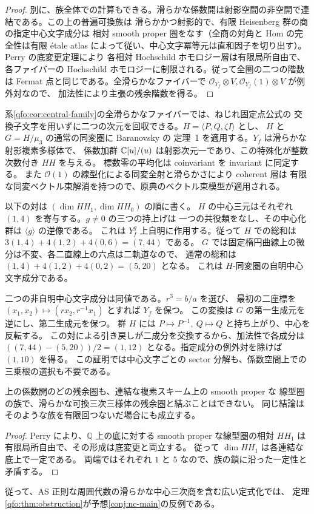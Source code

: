 \begin{proof}
別に、族全体での計算もできる。滑らかな係数開は射影空間の非空開で連結である。この上の普遍可換族は
滑らかかつ射影的で、有限 Heisenberg 群の商の指定中心文字成分は
相対 smooth proper 圏をなす（全商の対角と Hom の完全性は有限
\'etale atlas によって従い、中心文字冪等元は直和因子を切り出す）。
Perry \cite[Theorem~3.5]{QFOPerryHodge} の底変更定理により
各相対 Hochschild ホモロジー層は有限局所自由で、各ファイバーの
Hochschild ホモロジーに制限される。従って全圏の二つの階数は
Fermat 点と同じである。全滑らかなファイバーで
$\mathcal O_{Y_f}\otimes V,\mathcal O_{Y_f}(1)\otimes V$ が例外対なので、
加法性により主張の残余階数を得る。

\end{proof}

\begin{remark}[通常の固定点公式による独立計算]\label{qfo:rem:heisenberg-check}
系\ref{qfo:cor:central-family}の全滑らかなファイバーでは、ねじれ固定点公式の
交換子文字を用いずに二つの次元を回収できる。$H=\langle P,Q,\zeta I\rangle$ とし、
$H$ と $G=H/\mu_3$ の通常の同変圏に Baranovsky の
定理~1 \cite{QFOBaranovskyOrbifold}を適用する。$Y_f$ は滑らかな射影複素多様体で、
係数加群 $\mathbb C[u]/(u)$ は射影次元一であり、この特殊化が整数次数付き $HH$ を与える。
標数零の平均化は coinvariant を invariant に同定する。
また $\mathcal O(1)$ の線型化による同変全射と滑らかさにより coherent 層は
有限な同変ベクトル束解消を持つので、原典のベクトル束模型が適用される。

以下の対は $(\dim HH_1,\dim HH_0)$ の順に書く。
$H$ の中心三元はそれぞれ $(1,4)$ を寄与する。$g\ne0$ の三つの持上げは
一つの共役類をなし、その中心化群は $\langle g\rangle$ の逆像である。
これは $Y_f^g$ 上自明に作用する。従って $H$ での総和は
$3(1,4)+4(1,2)+4(0,6)=(7,44)$ である。
$G$ では固定楕円曲線上の微分は不変、各二直線上の六点は二軌道なので、
通常の総和は $(1,4)+4(1,2)+4(0,2)=(5,20)$ となる。
これは $H$-同変圏の自明中心文字成分である。

二つの非自明中心文字成分は同値である。$r^3=b/a$ を選び、
最初の二座標を $(x_1,x_2)\mapsto(r x_2,r^{-1}x_1)$ とすれば $Y_f$ を保つ。
この変換は $G$ の第一生成元を逆にし、第二生成元を保つ。
群 $H$ には $P\mapsto P^{-1},\ Q\mapsto Q$ と持ち上がり、中心を反転する。
この対による引き戻しが二成分を交換するから、加法性で各成分は
$((7,44)-(5,20))/2=(1,12)$ となる。指定成分の例外対を除けば $(1,10)$ を得る。
この証明では中心文字ごとの sector 分解も、係数空間上での三乗根の選択も不要である。
\end{remark}

\begin{corollary}[可換三次からの滑らかな変形に対する障害]
\label{qfo:cor:deformation-separation}
上の係数開のどの残余圏も、連結な複素スキーム上の smooth proper な
線型圏の族で、滑らかな可換三次三様体の残余圏と結ぶことはできない。
同じ結論はそのような族を有限回つないだ場合にも成立する。
\end{corollary}
\begin{proof}
Perry \cite[Theorem~3.5]{QFOPerryHodge} により、$\mathbb Q$ 上の底に対する
smooth proper な線型圏の相対 $HH_1$ は有限局所自由で、その形成は底変更と両立する。
従って $\dim HH_1$ は各連結な底上で一定である。
両端ではそれぞれ $1$ と $5$ なので、族の鎖に沿った一定性と矛盾する。
\end{proof}

従って、AS 正則な周囲代数の滑らかな中心三次商を含む広い定式化では、
定理\ref{qfo:thm:obstruction}が予想\ref{conj:nc-main}の反例である。
